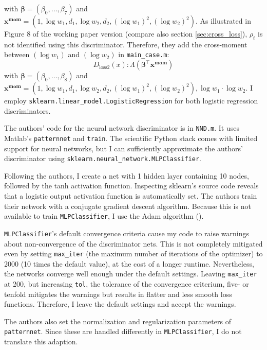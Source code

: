 with $\mathbf{\beta} = (\beta_0, \ldots, \beta_7)$ and $\mathbf{x^{mom}} = (1, \log w_1, d_1, \log w_2, d_2, (\log w_1)^2, (\log w_2)^2)$.
As illustrated in Figure 8 of the working paper version (compare also section \ref{sec:cross_loss}), $\rho_t$ is not identified using this discriminator.
Therefore, they add the cross-moment between $(\log w_1)$ and $(\log w_2)$ in \texttt{main\_case.m}:
\begin{equation}
    D_{\text{loss2}}(x) : \Lambda(\mathbf{\beta}^{\intercal} \mathbf{x^{mom}})
\end{equation}
with $\mathbf{\beta} = (\beta_0, \ldots, \beta_8)$ and $\mathbf{x^{mom}} = (1, \log w_1, d_1, \log w_2, d_2, (\log w_1)^2, (\log w_2)^2), \log w_1 \cdot \log w_2$.
I employ \texttt{sklearn.linear\_model.LogisticRegression} for both logistic regression discriminators.

The authors' code for the neural network discriminator is in \texttt{NND.m}.
It uses Matlab's \texttt{patternnet} and \texttt{train}.
The scientific Python stack comes with limited support for neural networks, but I can sufficiently approximate the authors' discriminator using \texttt{sklearn.neural\_network.MLPClassifier}.

Following the authors, I create a net with 1 hidden layer containing 10 nodes, followed by the tanh activation function.
Inspecting sklearn's source code reveals that a logistic output activation function is automatically set. %
The authors train their network with a conjugate gradient descent algorithm.
Because this is not available to train \texttt{MLPClassifier}, I use the Adam algorithm (\textcite{diederik2014adam}).

\texttt{MLPClassifier}'s default convergence criteria cause my code to raise warnings about non-convergence of the discriminator nets.
This is not completely mitigated even by setting \texttt{max\_iter} (the maximum number of iterations of the optimizer) to 2000 (10 times the default value), at the cost of a longer runtime. %
Nevertheless, the networks converge well enough under the default settings. %
Leaving \texttt{max\_iter} at 200, but increasing \texttt{tol}, the tolerance of the convergence criterium, five- or tenfold mitigates the warnings but results in flatter and less smooth loss functions. %
Therefore, I leave the default settings and accept the warnings.

The authors also set the normalization and regularization parameters of \texttt{patternnet}.
Since these are handled differently in \texttt{MLPClassifier}, I do not translate this adaption.

